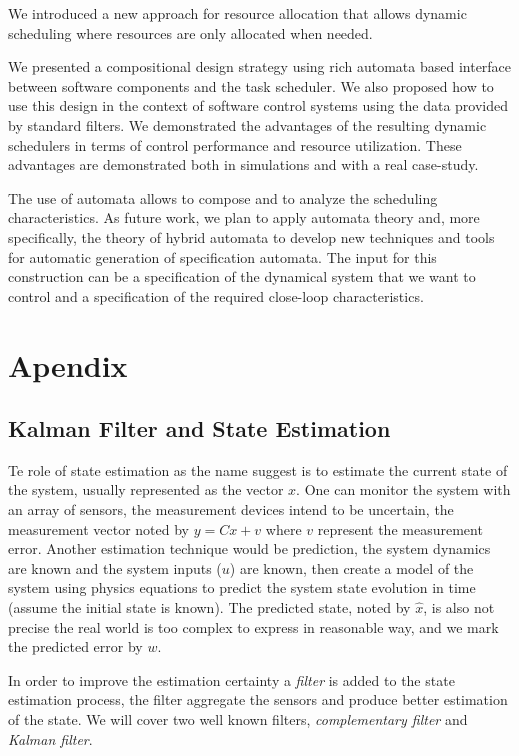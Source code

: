 \documentclass[ twoside, 12pt ]{article}
\begin{document}
We introduced a new approach for resource allocation that allows dynamic scheduling where resources are only allocated when needed.

We presented a compositional design strategy using rich automata based interface between software components and the task scheduler. We also proposed how to use this design in the context of software control systems using the data provided by standard filters.
We demonstrated the advantages of the resulting dynamic schedulers in terms of control performance and resource utilization. These advantages are demonstrated both in simulations and with a real case-study.

The use of automata allows to compose and to analyze the scheduling characteristics. As future work, we plan to apply automata theory and, more specifically, the theory of hybrid automata to develop new techniques and tools for automatic generation of specification automata. The input for this construction can be a specification of the dynamical system that we want to control and a specification of the required close-loop characteristics. 


\section{Apendix}
\subsection{Kalman Filter and State Estimation}
\label{sec:kalman}
Te role of state estimation as the name suggest is to estimate the current state of the system, usually represented as the vector $x$.
One can monitor the system with an array of sensors, the measurement devices intend to be uncertain, the measurement vector noted by $y=Cx+v$ where $v$ represent the measurement error.
Another estimation technique would be prediction, the system dynamics are known and the system inputs ($u$) are known, then create a model of the system using physics equations to predict the system state evolution in time (assume the initial state is known).
The predicted state, noted by $\hat{x}$, is also not precise the real world is too complex to express in reasonable way, and we mark the predicted error by $w$.

In order to improve the estimation certainty a \textit{filter} is added to the state estimation process, the filter aggregate the sensors and produce better estimation of the state.
We will cover two well known filters, \textit{complementary filter} and \textit{Kalman filter}.
\end{document}
